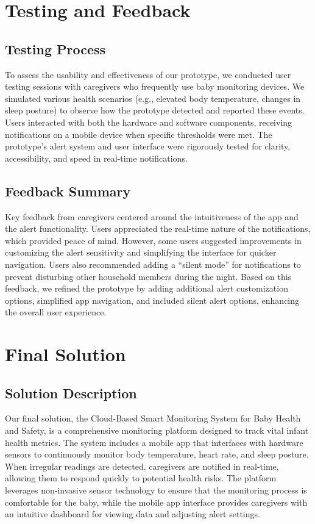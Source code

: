 \documentclass[12pt,a4paper]{report}
\begin{document}
\chapter{Testing and Feedback}
\section{Testing Process}
To assess the usability and effectiveness of our prototype, we conducted user testing sessions with caregivers who frequently use baby monitoring devices. We simulated various health scenarios (e.g., elevated body temperature, changes in sleep posture) to observe how the prototype detected and reported these events. Users interacted with both the hardware and software components, receiving notifications on a mobile device when specific thresholds were met. The prototype’s alert system and user interface were rigorously tested for clarity, accessibility, and speed in real-time notifications.

\section{Feedback Summary}
Key feedback from caregivers centered around the intuitiveness of the app and the alert functionality. Users appreciated the real-time nature of the notifications, which provided peace of mind. However, some users suggested improvements in customizing the alert sensitivity and simplifying the interface for quicker navigation. Users also recommended adding a “silent mode” for notifications to prevent disturbing other household members during the night. Based on this feedback, we refined the prototype by adding additional alert customization options, simplified app navigation, and included silent alert options, enhancing the overall user experience.

\chapter{Final Solution}
\section{Solution Description}
Our final solution, the Cloud-Based Smart Monitoring System for Baby Health and Safety, is a comprehensive monitoring platform designed to track vital infant health metrics. The system includes a mobile app that interfaces with hardware sensors to continuously monitor body temperature, heart rate, and sleep posture. When irregular readings are detected, caregivers are notified in real-time, allowing them to respond quickly to potential health risks. The platform leverages non-invasive sensor technology to ensure that the monitoring process is comfortable for the baby, while the mobile app interface provides caregivers with an intuitive dashboard for viewing data and adjusting alert settings.
\end{document}
